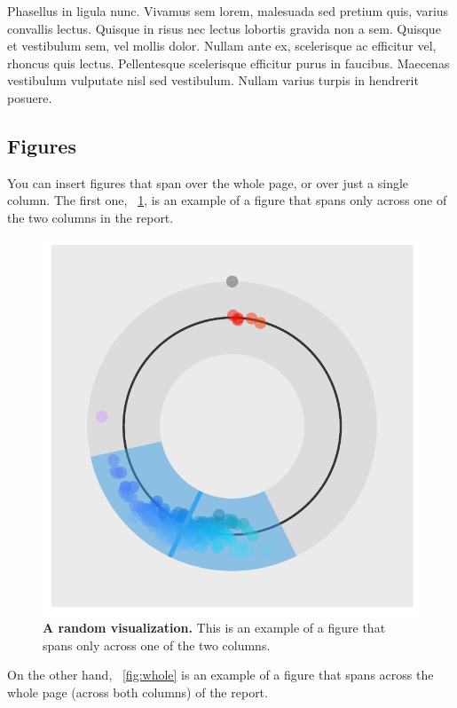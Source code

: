 \documentclass[fleqn,moreauthors,10pt]{ds_report}
\begin{document}
Phasellus in ligula nunc. Vivamus sem lorem, malesuada sed pretium quis, varius convallis lectus. Quisque in risus nec lectus lobortis gravida non a sem. Quisque et vestibulum sem, vel mollis dolor. Nullam ante ex, scelerisque ac efficitur vel, rhoncus quis lectus. Pellentesque scelerisque efficitur purus in faucibus. Maecenas vestibulum vulputate nisl sed vestibulum. Nullam varius turpis in hendrerit posuere.


\subsection*{Figures}

You can insert figures that span over the whole page, or over just a single column. The first one, \figurename~\ref{fig:column}, is an example of a figure that spans only across one of the two columns in the report.

\begin{figure}[ht]\centering
	\includegraphics[width=\linewidth]{single_column.pdf}
	\caption{\textbf{A random visualization.} This is an example of a figure that spans only across one of the two columns.}
	\label{fig:column}
\end{figure}

On the other hand, \figurename~\ref{fig:whole} is an example of a figure that spans across the whole page (across both columns) of the report.
\end{document}
